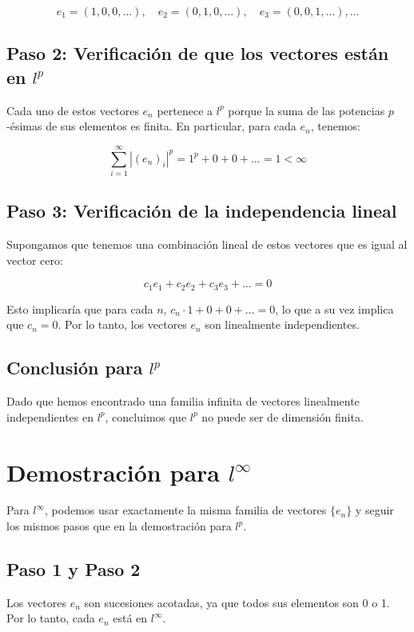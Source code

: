 \documentclass{article}
\begin{document}
\[
e_1 = (1, 0, 0, \ldots), \quad e_2 = (0, 1, 0, \ldots), \quad e_3 = (0, 0, 1, \ldots), \ldots
\]

\subsection*{Paso 2: Verificación de que los vectores están en \( l^p \)}

Cada uno de estos vectores \( e_n \) pertenece a \( l^p \) porque la suma de las potencias \( p \)-ésimas de sus elementos es finita. En particular, para cada \( e_n \), tenemos:

\[
\sum_{i=1}^\infty |(e_n)_i|^p = 1^p + 0 + 0 + \ldots = 1 < \infty
\]

\subsection*{Paso 3: Verificación de la independencia lineal}

Supongamos que tenemos una combinación lineal de estos vectores que es igual al vector cero:

\[
c_1 e_1 + c_2 e_2 + c_3 e_3 + \ldots = 0
\]

Esto implicaría que para cada \( n \), \( c_n \cdot 1 + 0 + 0 + \ldots = 0 \), lo que a su vez implica que \( c_n = 0 \). Por lo tanto, los vectores \( e_n \) son linealmente independientes.

\subsection*{Conclusión para \( l^p \)}

Dado que hemos encontrado una familia infinita de vectores linealmente independientes en \( l^p \), concluimos que \( l^p \) no puede ser de dimensión finita.

\section*{Demostración para \( l^\infty \)}

Para \( l^\infty \), podemos usar exactamente la misma familia de vectores \( \{ e_n \} \) y seguir los mismos pasos que en la demostración para \( l^p \).

\subsection*{Paso 1 y Paso 2}

Los vectores \( e_n \) son sucesiones acotadas, ya que todos sus elementos son 0 o 1. Por lo tanto, cada \( e_n \) está en \( l^\infty \).
\end{document}
